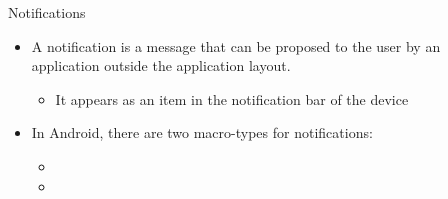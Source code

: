 \documentclass{beamer}
\begin{document}
  \begin{frame}{Notifications}
    \begin{itemize}\itemsep10pt
      \item A notification is a message that can be proposed to the user by an
      application outside the application layout.
      \begin{itemize}
        \item It appears as an item in the notification bar of the device
      \end{itemize}
      \item In Android, there are two macro-types for notifications: 
      \begin{itemize}
        \item {}
        \item {}
      \end{itemize}
    \end{itemize}
    \vfill
    \\
  \end{frame}
\end{document}
